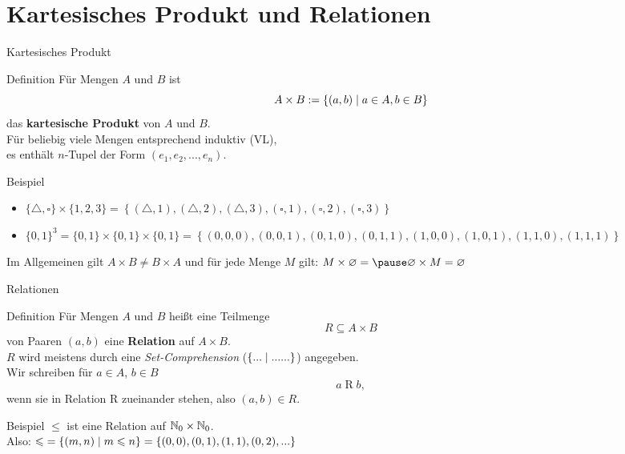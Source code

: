 \section{Kartesisches Produkt und Relationen}

\begin{frame}{Kartesisches Produkt}
	\begin{block}{Definition}
		Für Mengen $A$ und $B$ ist
		$$A \times B := \left\{ (a,b) \;\middle|\; a \in A, b \in B \right\}$$
		das \textbf{kartesische Produkt} von $A$ und $B$. \\
		\impl Für beliebig viele Mengen entsprechend induktiv (VL), \\
		es enthält $n$-Tupel der Form $(e_1, e_2, ..., e_n)$.
	\end{block}

	\pause
	\begin{exampleblock}{Beispiel}
		\begin{itemize}
			\item $\{\triangle,\square\} \times \{1, 2, 3\} = \left\{(\triangle, 1), (\triangle, 2), (\triangle, 3), (\square, 1), (\square, 2), (\square, 3)\right\}$ 
			\item 	$\{0, 1\}^3 = \{0,1\} \times \{0,1\} \times \{0,1\} = \left\{(0, 0, 0), (0, 0, 1), (0, 1, 0), (0, 1, 1), (1, 0, 0), (1, 0, 1), (1, 1, 0), (1, 1, 1)\right\} $
		\end{itemize}
		
		\pause
	   Im Allgemeinen gilt $ A \times B \neq B \times A $ und
	   für jede Menge $M$ gilt: $ M \times \emptyset = \pause \emptyset \times M = \emptyset$
	\end{exampleblock}
\end{frame}

\begin{frame}{Relationen}
	\begin{block}{Definition}
		Für Mengen $A$ und $B$ heißt eine Teilmenge 
		$$R \subseteq A \times B$$
		von Paaren $(a,b)$ eine \textbf{Relation} auf $A \times B$. \\
		\smallskip
		$R$ wird meistens durch eine \emph{Set-Comprehension} ($\left\{... \vphantom{(} \;\middle|\; ......\right\}$) angegeben. \\
		\smallskip
		Wir schreiben für $a \in A$, $b \in B$ 
		$$a \mathrel{R} b, $$
		wenn sie in Relation R zueinander stehen, also $(a, b) \in R$.
	\end{block}
	
	\pause
	\begin{exampleblock}{Beispiel} 
		$\leq$ ist eine Relation auf $\mathbb{N}_0 \times \mathbb{N}_0 $. \\
		Also: $ \text{$\leqslant$} = \left\{(m, n) \;\middle|\; m \leqslant n \right\} = \{(0, 0), (0, 1), (1, 1), (0, 2), ...\} $
	\end{exampleblock}
\end{frame}

